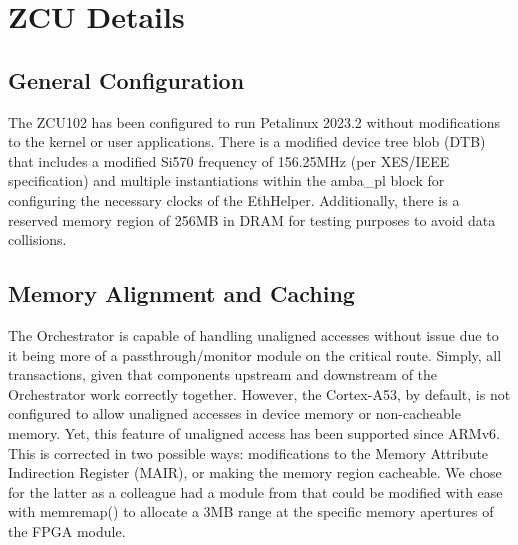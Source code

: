 \section{ZCU Details}
\label{ZCUDetails}

\subsection{General Configuration}
The ZCU102 has been configured to run Petalinux 2023.2 without modifications to the kernel or user applications. There is a modified device tree blob (DTB) that includes a modified Si570 frequency of 156.25MHz (per XES/IEEE specification) and multiple instantiations within the amba\_pl block for configuring the necessary clocks of the EthHelper. Additionally, there is a reserved memory region of 256MB in DRAM for testing purposes to avoid data collisions. 

\subsection{Memory Alignment and Caching}
The Orchestrator is capable of handling unaligned accesses without issue due to it being more of a passthrough/monitor module on the critical route. Simply, all transactions, given that components upstream and downstream of the Orchestrator work correctly together. However, the Cortex-A53, by default, is not configured to allow unaligned accesses in device memory or non-cacheable memory. Yet, this feature of unaligned access has been supported since ARMv6\cite{ARMv6M_Architecture_Reference_Manual}. This is corrected in two possible ways: modifications to the Memory Attribute Indirection Register (MAIR), or making the memory region cacheable. We chose for the latter as a colleague had a module from \cite{Izhbirdeev2024} that could be modified with ease with memremap() to allocate a 3MB range at the specific memory apertures of the FPGA module.
